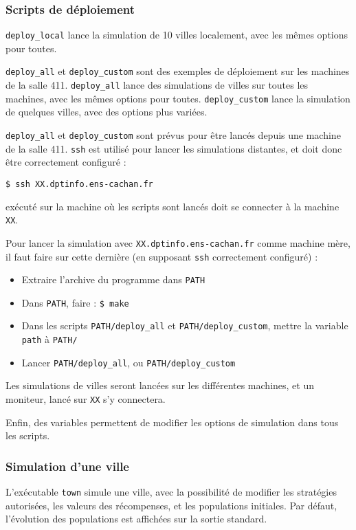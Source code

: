 \documentclass[10pt]{article}
\begin{document}
\subsubsection{Scripts de déploiement}
\verb|deploy_local| lance la simulation de 10 villes localement, avec les mêmes options pour toutes.

\verb|deploy_all| et \verb|deploy_custom| sont des exemples de déploiement sur les machines de la salle 411.
\verb|deploy_all| lance des simulations de villes sur toutes les machines, avec les mêmes options pour toutes.
\verb|deploy_custom| lance la simulation de quelques villes, avec des options plus variées.

\verb|deploy_all| et \verb|deploy_custom| sont prévus pour être lancés depuis une machine de la salle 411.
\verb|ssh| est utilisé pour lancer les simulations distantes, et doit donc être correctement configuré :
\begin{verbatim}
$ ssh XX.dptinfo.ens-cachan.fr
\end{verbatim}
exécuté sur la machine où les scripts sont lancés doit se connecter à la machine \verb|XX|.

Pour lancer la simulation avec \verb|XX.dptinfo.ens-cachan.fr| comme machine mère, il faut faire
sur cette dernière (en supposant \verb|ssh| correctement configuré) :
\begin{itemize}
\item Extraire l'archive du programme dans \verb|PATH|
\item Dans \verb|PATH|, faire : \verb|$ make|
\item Dans les scripts \verb|PATH/deploy_all| et \verb|PATH/deploy_custom|, mettre la variable \verb|path| à \verb|PATH/|
\item Lancer \verb|PATH/deploy_all|, ou \verb|PATH/deploy_custom|
\end{itemize}

Les simulations de villes seront lancées sur les différentes machines, et un moniteur, lancé sur \verb|XX| s'y connectera.

Enfin, des variables permettent de modifier les options de simulation dans tous les scripts.


\subsubsection{Simulation d'une ville}
L'exécutable \verb|town| simule une ville, avec la possibilité de modifier les stratégies autorisées,
les valeurs des récompenses, et les populations initiales. Par défaut, l'évolution des populations
est affichées sur la sortie standard.
\end{document}
